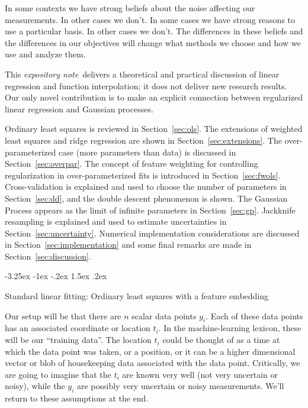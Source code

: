 \documentclass[12pt,letterpaper]{article}
\makeatletter
\renewcommand\section{\@startsection {section}{1}{\z@}%
  {-3.25ex \@plus -1ex \@minus -.2ex}%
  {1.5ex \@plus .2ex}%
  {\raggedright\normalfont\large\bfseries}}
\newcommand{\documentname}{\textsl{expository note}}
\newcommand{\sectionname}{Section}
\makeatother
\begin{document}
In some contexts we have strong beliefs about the noise affecting our measurements. In other cases we don't.
In some cases we have strong reasons to use a particular basis.
In other cases we don't.
The differences in these beliefs and the differences in our objectives will change what methods we choose and how we use and analyze them.

This \documentname\ delivers a theoretical and practical discussion of linear regression and function interpolation; it does not deliver new research results. Our only novel contribution is to make an explicit connection between regularized linear regression and Gaussian processes.

Ordinary least squares is reviewed in \sectionname~\ref{sec:ols}.
The extensions of weighted least squares and ridge regression are shown in \sectionname~\ref{sec:extensions}.
The over-para\-meterized case (more parameters than data) is discussed in \sectionname~\ref{sec:overpar}.
The concept of feature weighting for controlling regularization in over-parameterized fits is introduced in \sectionname~\ref{sec:fwols}.
Cross-validation is explained and used to choose the number of parameters in \sectionname~\ref{sec:dd}, and the double descent phenomenon is shown.
The Gaussian Process appears as the limit of infinite parameters in \sectionname~\ref{sec:gp}.
Jackknife resampling is explained and used to estimate uncertainties in \sectionname~\ref{sec:uncertainty}.
Numerical implementation considerations are discussed in \sectionname~\ref{sec:implementation} and some final remarks are made in \sectionname~\ref{sec:discussion}.

\section{Standard linear fitting: Ordinary least squares with a feature embedding}\label{sec:ols}

Our setup will be that there are $n$ scalar data points $y_i$.
Each of these data points has an associated coordinate or location $t_i$.
In the machine-learning lexicon, these will be our ``training data''.
The location $t_i$ could be thought of as a time at which the data point was taken, or a position, or it can be a higher dimensional vector or blob of housekeeping data associated with the data point.
Critically, we are going to imagine that the $t_i$ are known very well (not very uncertain or noisy), while the $y_i$ are possibly very uncertain or noisy measurements.
We'll return to these assumptions at the end.
\end{document}
